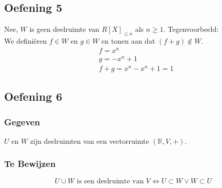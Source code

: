 \documentclass[lineaire_algebra_oplossingen.tex]{subfiles}
\begin{document}
\subsection{Oefening 5}
Nee, $W$ is geen deelruimte van $R[X]_{\le n}$ als $n\ge 1$. Tegenvoorbeeld:\\
We defini\"eren $f \in W$ en $g \in W$ en tonen aan dat $(f+g) \not \in W$.
\begin{align*}
&f = x^n \\
&g = -x^n + 1 \\
&f+g = x^n - x^n + 1 = 1
\end{align*}

\subsection{Oefening 6}
\subsubsection*{Gegeven}
$U$ en $W$ zijn deelruimten van een vectorruimte $(\mathbb{R},V,+)$.
\subsubsection*{Te Bewijzen}
\[
U \cup W \text{ is een deelruimte van }V \Leftrightarrow U \subset W \vee W \subset U
\]
\end{document}
